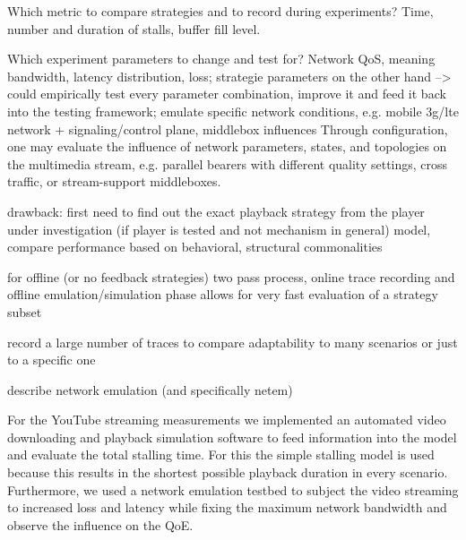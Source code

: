 


Which metric to compare strategies and to record during experiments? Time, number and duration of stalls, buffer fill level.

Which experiment parameters to change and test for? Network \gls{QoS}, meaning bandwidth, latency distribution, loss; strategie parameters on the other hand --> could empirically test every parameter combination, improve it and feed it back into the testing framework; emulate specific network conditions, e.g. mobile 3g/lte network + signaling/control plane, middlebox influences
 Through configuration, one may evaluate the influence of network parameters, states, and topologies on the multimedia stream, e.g. parallel bearers with different quality settings, cross traffic, or stream-support middleboxes.


drawback: first need to find out the exact playback strategy from the player under investigation (if player is tested and not mechanism in general)
model, compare performance based on behavioral, structural commonalities

for offline (or no feedback strategies) two pass process, online trace recording and offline emulation/simulation phase
allows for very fast evaluation of a strategy subset

record a large number of traces to compare adaptability to many scenarios or just to a specific one


describe network emulation (and specifically netem)








For the YouTube streaming measurements we implemented an automated video downloading and playback simulation software to feed information into the model and evaluate the total stalling time. For this the simple stalling model is used because this results in the shortest possible playback duration in every scenario. Furthermore, we used a network emulation testbed to subject the video streaming to increased loss and latency while fixing the maximum network bandwidth and observe the influence on the QoE.


